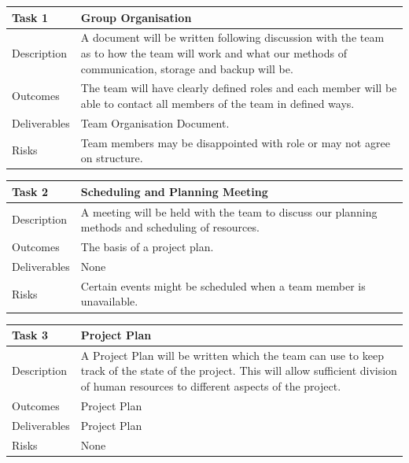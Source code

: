 \documentclass{l3proj}
\begin{document}
\begin{center}
    \begin{tabular}{ | l | p{12cm} |}
    \hline	
    Task 1 & Group Organisation \\ \hline
    Description & A document will be written following discussion with the team as to how the
	team will work and what our methods of communication, storage and backup will be. \\ \hline   
    Outcomes & The team will have clearly defined roles and each member will be able to contact all members of the team in defined ways. \\ \hline
    Deliverables & Team Organisation Document. \\ \hline
    Risks & Team members may be disappointed with role or may not agree on structure. \\ 
    \hline
    \end{tabular}
\end{center}

\begin{center}
    \begin{tabular}{ | l | p{12cm} |}
    \hline	
    Task 2 & Scheduling and Planning Meeting \\ \hline
    Description & A meeting will be held with the team to discuss our planning methods and scheduling of resources. \\ \hline   
    Outcomes & The basis of a project plan. \\ \hline
    Deliverables & None \\ \hline
    Risks & Certain events might be scheduled when a team member is unavailable. \\ 
    \hline
    \end{tabular}
\end{center}

\begin{center}
    \begin{tabular}{ | l | p{12cm} |}
    \hline	
    Task 3 & Project Plan \\ \hline
    Description & A Project Plan will be written which the team can use to keep track of the state of the project. This will allow sufficient division of human resources to different aspects of the project. \\ \hline   
    Outcomes & Project Plan \\ \hline
    Deliverables & Project Plan \\ \hline
    Risks & None \\ 
    \hline
    \end{tabular}
\end{center}
\end{document}
